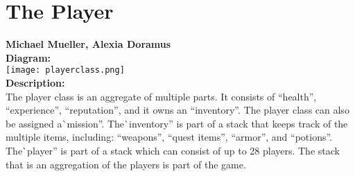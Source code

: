 \documentclass[12pt]{report}
\begin{document}
     \chapter{The Player}
     \textbf{Michael Mueller, Alexia Doramus}\\

     \noindent\textbf{Diagram:}\\
     \texttt{[image: playerclass.png]}\\

     \noindent\textbf{Description:}\\
     The player class is an aggregate of multiple parts. It consists of ``health'', ``experience'', ``reputation'', and it owns an ``inventory''. The player class can also be assigned a\`{ }mission''. The\`{ }inventory'' is part of a stack that keeps track of the multiple items, including: ``weapons'', ``quest items'', ``armor'', and ``potions''. The\`{ }player'' is part of a stack which can consist of up to 28 players. The stack that is an aggregation of the players is part of the game.
\end{document}
